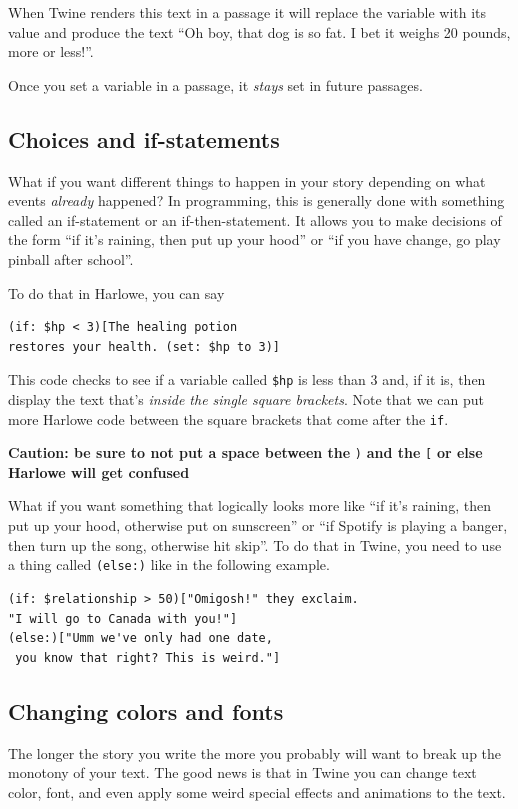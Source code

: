 \documentclass[a5paper,11pt]{article}
\begin{document}
When Twine renders this text in a passage it will replace the variable with its value and produce the text ``Oh boy, that dog is so fat. I bet it weighs 20 pounds, more or less!''.

Once you set a variable in a passage, it \emph{stays} set in future passages. 

\subsection{Choices and if-statements}
What if you want different things to happen in your story depending on what events \emph{already} happened? In programming, this is generally done with something called an if-statement or an if-then-statement. It allows you to make decisions of the form ``if it's raining, then put up your hood'' or ``if you have change, go play pinball after school''.

To do that in Harlowe, you can say
\begin{verbatim}
(if: $hp < 3)[The healing potion 
restores your health. (set: $hp to 3)]
\end{verbatim}
This code checks to see if a variable called \verb"$hp" is less than 3 and, if it is, then display the text that's \emph{inside the single square brackets}. Note that we can put more Harlowe code between the square brackets that come after the \verb"if".

\textbf{Caution: be sure to not put a space between the} \verb")" \textbf{and the} \verb"[" \textbf{or else Harlowe will get confused}

What if you want something that logically looks more like ``if it's raining, then put up your hood, otherwise put on sunscreen'' or ``if Spotify is playing a banger, then turn up the song, otherwise hit skip''. To do that in Twine, you need to use a thing called \verb"(else:)" like in the following example.

\begin{verbatim}
(if: $relationship > 50)["Omigosh!" they exclaim. 
"I will go to Canada with you!"]
(else:)["Umm we've only had one date, 
 you know that right? This is weird."]
\end{verbatim}

\subsection{Changing colors and fonts}
The longer the story you write the more you probably will want to break up the monotony of your text. The good news is that in Twine you can change text color, font, and even apply some weird special effects and animations to the text.
\end{document}
